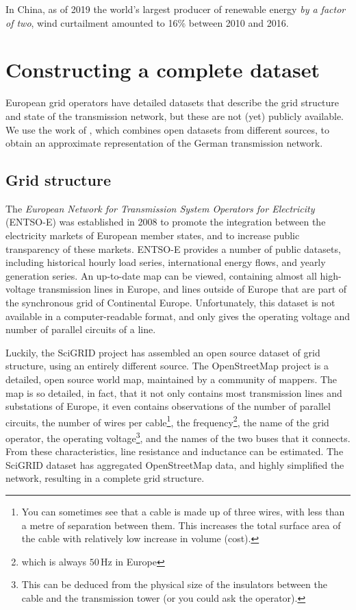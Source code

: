 \documentclass[main.tex]{subfiles}
\begin{document}
In China, as of 2019 the world's largest producer of renewable energy \emph{by a factor of two},  wind curtailment amounted to 16\% between 2010 and 2016. \citep{Qi2018}  



\section{Constructing a complete dataset}
European grid operators have detailed datasets that describe the grid structure and state of the transmission network, but these are not (yet) publicly available. We use the work of \cite{PyPSA}, which combines open datasets from different sources, to obtain an approximate representation of the German transmission network.
\subsection{Grid structure}
The \emph{European Network for Transmission System Operators for Electricity} (ENTSO-E) was established in 2008 to promote the integration between the electricity markets of European member states, and to increase public transparency of these markets. 
ENTSO-E provides a number of public datasets, including historical hourly load series, international energy flows, and yearly generation series. 
An up-to-date map can be viewed, containing almost all high-voltage transmission lines in Europe, and lines outside of Europe that are part of the synchronous grid of Continental Europe. Unfortunately, this dataset is not available in a computer-readable format, and only gives the operating voltage and number of parallel circuits of a line.

Luckily, the SciGRID project has assembled an open source dataset of grid structure, using an entirely different source. The OpenStreetMap project is a detailed, open source world map, maintained by a community of mappers. The map is so detailed, in fact, that it not only contains most transmission lines and substations of Europe, it even contains observations of the number of parallel circuits, the number of wires per cable\footnote{You can sometimes see that a cable is made up of three wires, with less than a metre of separation between them. This increases the total surface area of the cable with relatively low increase in volume (\ie cost).}, the frequency\footnote{which is always $50\,\si{\hertz}$ in Europe}, the name of the grid operator, the operating voltage\footnote{This can be deduced from the physical size of the insulators between the cable and the transmission tower (or you could ask the operator).}, and the names of the two buses that it connects. From these characteristics, line resistance and inductance can be estimated.
The SciGRID dataset has aggregated OpenStreetMap data, and highly simplified the network, resulting in a complete grid structure. 
\end{document}
